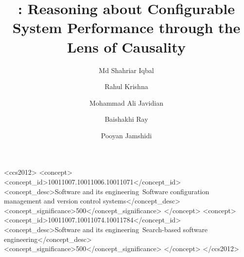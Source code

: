 \documentclass[sigplan,10pt]{acmart}
\author{Md Shahriar Iqbal}
\affiliation{%
  \institution{University of South Carolina}}
\author{Rahul Krishna}
\affiliation{%
  \institution{IBM Research}}
\author{Mohammad Ali Javidian}
\affiliation{%
  \institution{Purdue University}}
\author{Baishakhi Ray}
\affiliation{%
  \institution{Columbia University}}
\author{Pooyan Jamshidi}
\affiliation{%
  \institution{University of South Carolina}}
\begin{document}
\title{\ourapproach: Reasoning about Configurable System Performance through the Lens of Causality}

\graphicspath{{figures-vg/}}

\begin{CCSXML}
<ccs2012>
   <concept>
       <concept_id>10011007.10011006.10011071</concept_id>
       <concept_desc>Software and its engineering~Software configuration management and version control systems</concept_desc>
       <concept_significance>500</concept_significance>
       </concept>
   <concept>
       <concept_id>10011007.10011074.10011784</concept_id>
       <concept_desc>Software and its engineering~Search-based software engineering</concept_desc>
       <concept_significance>500</concept_significance>
       </concept>
 </ccs2012>
\end{CCSXML}
\maketitle












%


\balance

\clearpage 
\balance
\appendix

\clearpage

\end{document}
